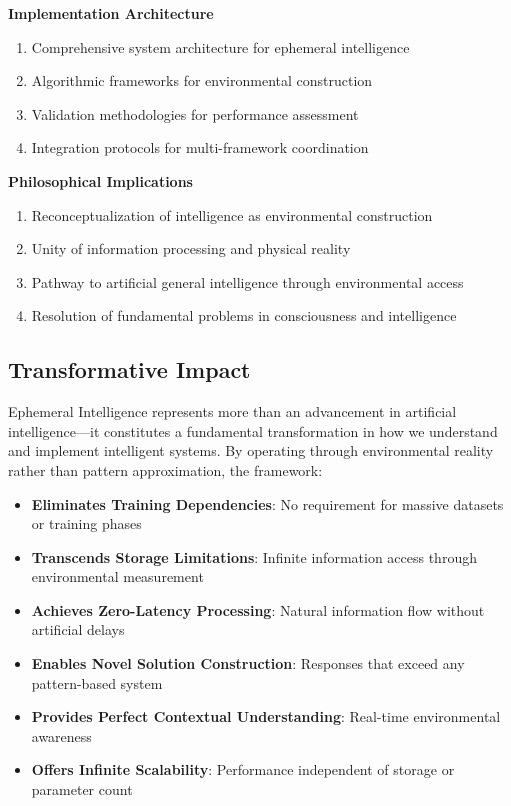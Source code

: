 \documentclass[12pt,a4paper]{article}
\begin{document}
\textbf{Implementation Architecture}
\begin{enumerate}
\item Comprehensive system architecture for ephemeral intelligence
\item Algorithmic frameworks for environmental construction
\item Validation methodologies for performance assessment
\item Integration protocols for multi-framework coordination
\end{enumerate}

\textbf{Philosophical Implications}
\begin{enumerate}
\item Reconceptualization of intelligence as environmental construction
\item Unity of information processing and physical reality
\item Pathway to artificial general intelligence through environmental access
\item Resolution of fundamental problems in consciousness and intelligence
\end{enumerate}

\subsection{Transformative Impact}

Ephemeral Intelligence represents more than an advancement in artificial intelligence—it constitutes a fundamental transformation in how we understand and implement intelligent systems. By operating through environmental reality rather than pattern approximation, the framework:

\begin{itemize}
\item \textbf{Eliminates Training Dependencies}: No requirement for massive datasets or training phases
\item \textbf{Transcends Storage Limitations}: Infinite information access through environmental measurement
\item \textbf{Achieves Zero-Latency Processing}: Natural information flow without artificial delays
\item \textbf{Enables Novel Solution Construction}: Responses that exceed any pattern-based system
\item \textbf{Provides Perfect Contextual Understanding}: Real-time environmental awareness
\item \textbf{Offers Infinite Scalability}: Performance independent of storage or parameter count
\end{itemize}
\end{document}
